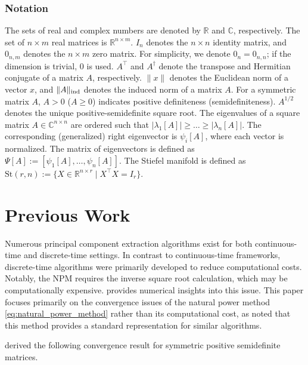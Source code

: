 \documentclass{ifacconf}
\begin{document}
\subsubsection*{Notation}
The sets of real and complex numbers are denoted by $\mathbb{R}$ and $\mathbb{C}$, respectively. The set of $n \times m$ real matrices is $\mathbb{R}^{n\times m}$. $I_n$ denotes the $n \times n$ identity matrix, and $0_{n,m}$ denotes the $n \times m$ zero matrix. For simplicity, we denote $0_{n} = 0_{n,n}$; if the dimension is trivial, $0$ is used. 
$A^{\top}$ and $A^{\dagger}$ denote the transpose and Hermitian conjugate of a matrix $A$, respectively. $\|x\|$ denotes the Euclidean norm of a vector $x$, and $\| A \| _{\rm ind}$ denotes the induced norm of a matrix $A$. For a symmetric matrix $A$, $A > 0$ ($A \geq 0$) indicates positive definiteness (semidefiniteness). $A^{1/2}$ denotes the unique positive-semidefinite square root. The eigenvalues of a square matrix $A \in \mathbb{C}^{n \times n}$ are ordered such that $|\lambda_1[A]| \geq \dots \geq | \lambda_n [A] |$. The corresponding (generalized) right eigenvector is $\psi_i [A]$, where each vector is normalized. The matrix of eigenvectors is defined as $\Psi[A] := [\psi _{1}[A] , \dots , \psi _{n}[A]]$. The Stiefel manifold is defined as $\mathrm{St}(r,n) := \{X \in \mathbb{R}^{n \times r} \mid X^{\top}X = I_r\}$.



\section{Previous Work}

Numerous principal component extraction algorithms exist for both continuous-time and discrete-time settings. 
In contrast to continuous-time frameworks, discrete-time algorithms were primarily developed to reduce computational costs. 
Notably, the NPM requires the inverse square root calculation, which may be computationally expensive. 
\cite{hua2004asymptotical} provides numerical insights into this issue. 
This paper focuses primarily on the convergence issues of the natural power method \eqref{eq:natural_power_method} rather than its computational cost, as \cite{hua1999new} noted that this method provides a standard representation for similar algorithms.

\cite{hua1999new} derived the following convergence result for symmetric positive semidefinite matrices.
\end{document}
